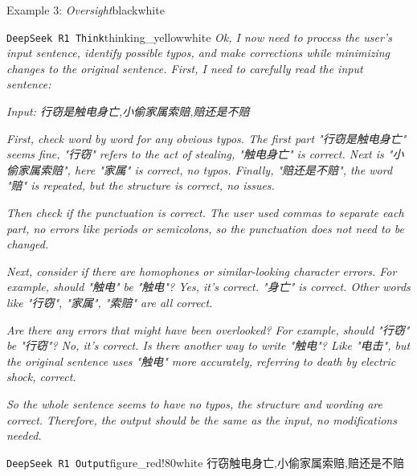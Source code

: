 \begin{figure*}[ph!]
\begin{scopebox}{Example 3: \textit{Oversight}}{black}{white}
\begin{scopebox}{\texttt{DeepSeek\,R1 Think}}{thinking_yellow}{white}
            \tcblower
            \qquad{}\textit{Ok, I now need to process the user's input sentence, identify possible typos, and make corrections while minimizing changes to the original sentence. First, I need to carefully read the input sentence:}\return

            \qquad{}\textit{Input: 行窃是触电身亡,小偷家属索赔,赔还是不赔}\return

            \qquad{}\textit{First, check word by word for any obvious typos. The first part "行窃是触电身亡" seems fine, "行窃" refers to the act of stealing, "触电身亡" is correct. Next is "小偷家属索赔", here "家属" is correct, no typos. Finally, "赔还是不赔", the word "赔" is repeated, but the structure is correct, no issues.}\return

            \qquad{}\textit{Then check if the punctuation is correct. The user used commas to separate each part, no errors like periods or semicolons, so the punctuation does not need to be changed.}\return

            \qquad{}\textit{Next, consider if there are homophones or similar-looking character errors. For example, should "触电" be "触电"? Yes, it's correct. "身亡" is correct. Other words like "行窃", "家属", "索赔" are all correct.}\return

            \qquad{}\textit{Are there any errors that might have been overlooked? For example, should "行窃" be "行窃"? No, it's correct. Is there another way to write "触电"? Like "电击", but the original sentence uses "触电" more accurately, referring to death by electric shock, correct.}\return

            \qquad{}\textit{So the whole sentence seems to have no typos, the structure and wording are correct. Therefore, the output should be the same as the input, no modifications needed.}\return
        \end{scopebox}
        \begin{scopebox}{\texttt{DeepSeek\,R1 Output}}{figure_red!80}{white}
            行窃触电身亡,小偷家属索赔,赔还是不赔
        \end{scopebox}
    \end{scopebox}
    \caption{
        Another example of {Incorrect Thinking}
    }
    \label{fig:thinking_example_4}
\end{figure*}
